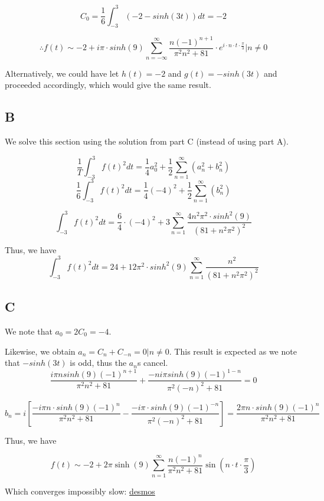 \documentclass{article}
\begin{document}
$$
C_0 = \frac{1}{6} \int_{-3}^{3} (-2-sinh(3t)) dt = -2
$$

$$
\therefore f(t) \sim -2 + i \pi \cdot sinh(9) \sum_{n=-\infty}^{\infty} \frac{n\left(-1\right)^{n+1}}{\pi^2n^2+81} \cdot e^{i \cdot n \cdot t \cdot \frac{\pi}{3}} \Bigr|n \neq 0
$$

Alternatively, we could have let $h(t) = -2$ and $g(t) = -sinh(3t)$ and proceeded accordingly, which would give the same result.

\subsection*{B}

We solve this section using the solution from part C (instead of using part A).

$$\frac{1}{T} \int_{-3}^{3} f(t)^2dt = \frac{1}{4} a_0^2 + \frac{1}{2} \sum_{n=1}^{\infty} \left(a_n^2+b_n^2\right)$$
$$\frac{1}{6} \int_{-3}^{3} f(t)^2dt = \frac{1}{4} (-4)^2 + \frac{1}{2} \sum_{n=1}^{\infty} \left(b_n^2\right)$$

$$
\int_{-3}^{3} f(t)^2 dt = \frac{6}{4} \cdot (-4)^2 + 3 \sum_{n=1}^{\infty} \frac{4 n^2 \pi^2 \cdot sinh^2(9)}{(81+n^2\pi^2)^2}
$$



Thus, we have
$$
\int_{-3}^{3} f(t)^2 dt = 24 + 12 \pi^2 \cdot sinh^2(9) \sum_{n=1}^{\infty} \frac{n^2}{(81+n^2\pi^2)^2}
$$

\subsection*{C}
We note that $a_0 = 2C_0=-4$. 

Likewise, we obtain $a_n = C_n + C_{-n} = 0\Bigr| n\neq 0$. This result is expected as we note that $-sinh(3t)$ is odd, thus the $a_n$s cancel.
$$
\frac{i\pi n sinh(9)\left(-1\right)^{n+1}}{\pi^2n^2+81} + \frac{-n i \pi sinh(9)\left(-1\right)^{1-n}}{\pi^2(-n)^2+81} = 0
$$

$$
b_n = i \left[ \frac{- i \pi n\cdot sinh(9)(-1)^{n}}{\pi^2n^2+81} - \frac{- i \pi \cdot sinh(9) (-1)^{-n}}{\pi^2(-n)^2+81}\right] = \frac{2\pi n \cdot sinh(9) (-1)^n}{\pi^2n^2+81}
$$

Thus, we have

$$
f(t) \sim -2 + 2\pi\sinh\left(9\right)\sum_{n=1}^{\infty}\frac{n\left(-1\right)^{n}}{\pi^{2}n^{2}+81}\sin\left(n\cdot t\cdot\frac{\pi}{3}\right)
$$


Which converges impossibly slow: \href{https://www.desmos.com/calculator/kahvvfuxgb}{desmos}
\end{document}
